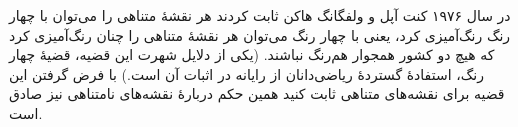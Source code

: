 در سال ۱۹۷۶ کنت آپل و ولفگانگ هاکن ثابت کردند هر نقشهٔ متناهی را می‌توان با چهار رنگ رنگ‌آمیزی کرد، یعنی با چهار رنگ می‌توان هر نقشهٔ متناهی را چنان رنگ‌آمیزی کرد که هیچ دو کشور همجوار هم‌رنگ نباشند. (یکی از دلایل شهرت این قضیه، قضیهٔ چهار رنگ، استفادهٔ گستردهٔ ریاضی‌دانان از رایانه در اثبات آن است.) با فرض گرفتن این قضیه برای نقشه‌های متناهی ثابت کنید همین حکم دربارهٔ نقشه‌های نامتناهی نیز صادق است.